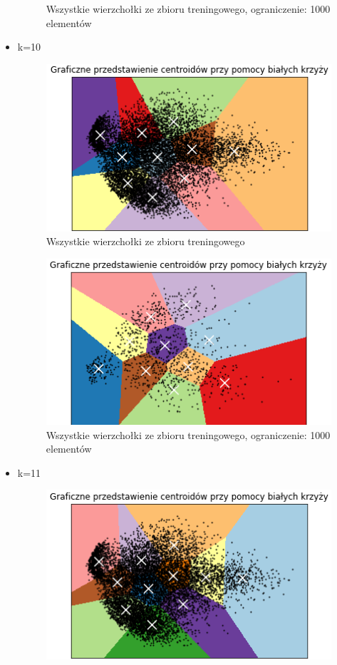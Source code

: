 \documentclass[a4paper,14pt]{report}
\begin{document}
\begin{itemize}
\begin{figure}[H]
	      \centering
	      \caption{Wszystkie wierzchołki ze zbioru treningowego, ograniczenie: 1000 elementów}
	    \end{figure}
	    \item k=10 
		\begin{figure}[H]
	      \includegraphics[scale=1.0]{k10}
	      \centering
	      \caption{Wszystkie wierzchołki ze zbioru treningowego}
	    \end{figure}
	    \begin{figure}[H]
	      \includegraphics[scale=1.0]{k101000}
	      \centering
	      \caption{Wszystkie wierzchołki ze zbioru treningowego, ograniczenie: 1000 elementów}
	    \end{figure}
	    \item k=11 
		\begin{figure}[H]
	      \includegraphics[scale=1.0]{k11}

\end{figure}
\end{itemize}
\end{document}

